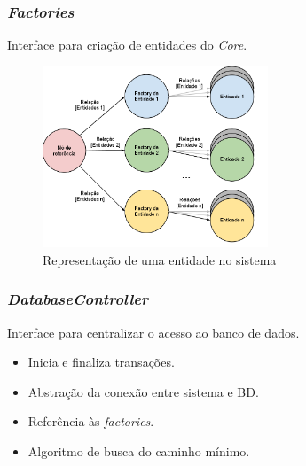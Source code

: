 \frame
{
\frametitle{\emph{Factories}}
Interface para criação de entidades do \emph{Core}.
\begin{figure}
\includegraphics[width=0.6\textwidth]{./imgs/grafoFactory.png}
\caption{Representação de uma entidade no sistema}
\end{figure}
}

\frame
{
\frametitle{\emph{DatabaseController}}
Interface para centralizar o acesso ao banco de dados.
\begin{itemize}
\item Inicia e finaliza transações.
\item Abstração da conexão entre sistema e BD.
\item Referência às \emph{factories}.
\item Algoritmo de busca do caminho mínimo.
\end{itemize}
}

